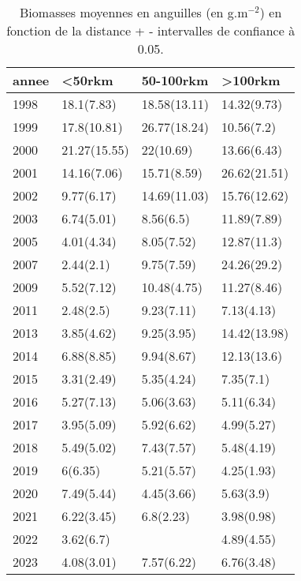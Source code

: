 \begin{table}[htbp]
\centering
\caption[Biomasse et distance.]{Biomasses moyennes en anguilles (en g.m$^{-2}$) en fonction de la distance + - intervalles de confiance à 0.05.} 
\label{table_biom_dist_annee}
\begin{tabular}{llll}
  \hline
annee & <50rkm & 50-100rkm & >100rkm \\ 
  \hline
1998 & 18.1(7.83) & 18.58(13.11) & 14.32(9.73) \\ 
  1999 & 17.8(10.81) & 26.77(18.24) & 10.56(7.2) \\ 
  2000 & 21.27(15.55) & 22(10.69) & 13.66(6.43) \\ 
  2001 & 14.16(7.06) & 15.71(8.59) & 26.62(21.51) \\ 
  2002 & 9.77(6.17) & 14.69(11.03) & 15.76(12.62) \\ 
  2003 & 6.74(5.01) & 8.56(6.5) & 11.89(7.89) \\ 
  2005 & 4.01(4.34) & 8.05(7.52) & 12.87(11.3) \\ 
  2007 & 2.44(2.1) & 9.75(7.59) & 24.26(29.2) \\ 
  2009 & 5.52(7.12) & 10.48(4.75) & 11.27(8.46) \\ 
  2011 & 2.48(2.5) & 9.23(7.11) & 7.13(4.13) \\ 
  2013 & 3.85(4.62) & 9.25(3.95) & 14.42(13.98) \\ 
  2014 & 6.88(8.85) & 9.94(8.67) & 12.13(13.6) \\ 
  2015 & 3.31(2.49) & 5.35(4.24) & 7.35(7.1) \\ 
  2016 & 5.27(7.13) & 5.06(3.63) & 5.11(6.34) \\ 
  2017 & 3.95(5.09) & 5.92(6.62) & 4.99(5.27) \\ 
  2018 & 5.49(5.02) & 7.43(7.57) & 5.48(4.19) \\ 
  2019 & 6(6.35) & 5.21(5.57) & 4.25(1.93) \\ 
  2020 & 7.49(5.44) & 4.45(3.66) & 5.63(3.9) \\ 
  2021 & 6.22(3.45) & 6.8(2.23) & 3.98(0.98) \\ 
  2022 & 3.62(6.7) &  & 4.89(4.55) \\ 
  2023 & 4.08(3.01) & 7.57(6.22) & 6.76(3.48) \\ 
   \hline
\end{tabular}
\end{table}
